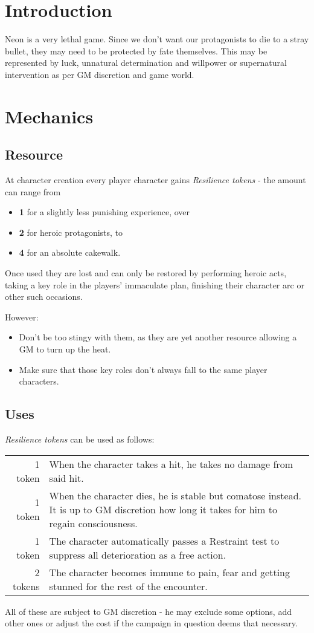 \documentclass[12pt,a4paper,openany]{book}
\begin{document}
	
	
	\chapter{Introduction}
	Neon is a very lethal game. Since we don't want our protagonists to die to a stray bullet, they may need to be protected by fate themselves. 
	This may be represented by luck, unnatural determination and willpower or supernatural intervention as per GM discretion and game world.

	\chapter{Mechanics}
	\section{Resource}
	At character creation every player character gains \emph{Resilience tokens} - the amount can range from
	\begin{itemize}
		\item \textbf{1} for a slightly less punishing experience, over
		\item \textbf{2} for heroic protagonists, to
		\item \textbf{4} for an absolute cakewalk.
	\end{itemize}
	Once used they are lost and can only be restored by performing heroic acts, taking a key role in the players' immaculate plan, finishing their character arc or other such occasions.
	\par
	However: \vspace{-6mm}
	\begin{itemize}
		\setlength\itemsep{-8mm}
		\item Don't be too stingy with them, as they are yet another resource allowing a GM to turn up the heat.
		\item Make sure that those key roles don't always fall to the same player characters.
	\end{itemize}

	\pagebreak
	\section{Uses}
	\emph{Resilience tokens} can be used as follows:
	\par
	\begin{tabularx}{\columnwidth}{rX}
		1 token & When the character takes a hit, he takes no damage from said hit. \\
		1 token & When the character dies, he is stable but comatose instead. It is up to GM discretion how long it takes for him to regain consciousness. \\
		1 token & The character automatically passes a Restraint test to suppress all deterioration as a free action. \\
		2 tokens & The character becomes immune to pain, fear and getting stunned for the rest of the encounter.
	\end{tabularx}
	\par
	All of these are subject to GM discretion - he may exclude some options, add other ones or adjust the cost if the campaign in question deems that necessary.
\end{document}
